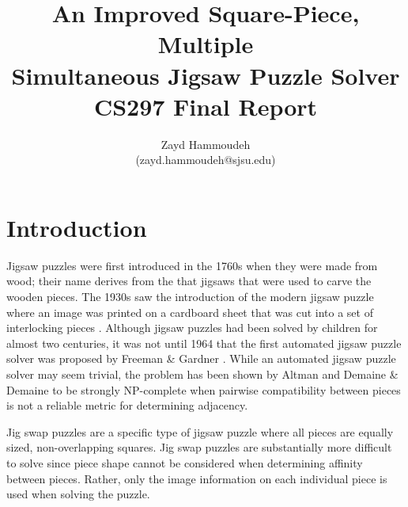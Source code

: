 \documentclass{report}
\title{   An Improved Square-Piece, Multiple
       \\ Simultaneous Jigsaw Puzzle Solver
       \\[1in]
	   CS297 Final Report}
\author{
  Zayd Hammoudeh \\
  (zayd.hammoudeh@sjsu.edu)
  }
\begin{document}
\maketitle


\renewcommand{\contentsname}{Table of Contents} %
\tableofcontents{\protect\newpage}

\listoffigures
\newpage

\listoftables
\newpage
 

\renewcommand\thesection{\arabic{section}}






\section{Introduction}\label{sec:introduction}

Jigsaw puzzles were first introduced in the 1760s when they were made from wood; their name derives from the that jigsaws that were used to carve the wooden pieces.   The 1930s saw the introduction of the modern jigsaw puzzle where an image was printed on a cardboard sheet that was cut into a set of interlocking pieces \cite{williams1990, williams2004}.  Although jigsaw puzzles had been solved by children for almost two centuries, it was not until 1964 that the first automated jigsaw puzzle solver was proposed by Freeman \& Gardner \cite{freeman1964}.  While an automated jigsaw puzzle solver may seem trivial, the problem has been shown by Altman \cite{altman1990} and Demaine \& Demaine \cite{demaine2007} to be strongly NP-complete when pairwise compatibility between pieces is not a reliable metric for determining adjacency.

Jig swap puzzles are a specific type of jigsaw puzzle where all pieces are equally sized, non-overlapping squares.  Jig swap puzzles are substantially more difficult to solve since piece shape cannot be considered when determining affinity between pieces.  Rather, only the image information on each individual piece is used when solving the puzzle.  
\end{document}
